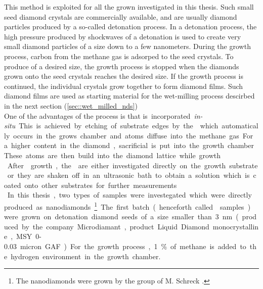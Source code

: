 	This method is exploited for all the \CVD grown \nds investigated in this thesis.
	Such small seed diamond crystals are commercially available, and are usually diamond particles produced by a so-called detonation process.
	In a detonation process, the high pressure produced by shockwaves of a detonation is used to create very small diamond particles of a size down to a few nanometers.
	During the \CVD growth process, carbon from the methane gas is adsorped  to the seed crystals.
	To produce \nds of a desired size, the growth process is stopped when the diamonds grown onto the seed crystals reaches the desired size. 
	If the growth process is continued, the individual crystals grow together to form diamond films. 
	Such diamond films are used as starting material for the wet-milling process descirbed in the next section (\autoref{sec::wet_milled_nds})
	\\
	One of the advantages of the \CVD process is that \si is incorporated \textit{in-situ}.
	This is achieved by etching of \si substrate edges by the which automatically occurs in the grows chamber and \si atoms diffuse into the methane gas. 
	For a higher \si content in the diamond, sacrificial \si is put into the growth chamber.
	These atoms are then build into the diamond lattice while growth.
	\\
	After \nd growth, the \nds are either investigated directly on the growth substrate or they are shaken off in an ultrasonic bath to obtain a solution which is coated onto other substrates for further measurements.
	\\
	In this thesis, two types of samples were investegated which were directly produced as nanodiamonds.
	\footnote{The \CVD nanodiamonds were grown by the group of M. Schreck \cite{}.}
	The first batch (henceforth called \CVD samples) were grown on detonation diamond seeds of a size smaller than \SI{3}{nm}(produced by the company Microdiamant, product Liquid Diamond monocrystalline, MSY {0-0.03} micron GAF).
	For the growth process, 1\% of methane is added to the hydrogen environment in the growth chamber.

